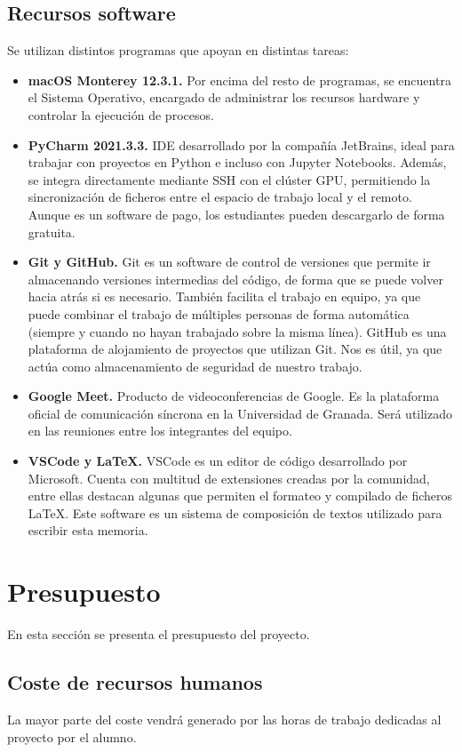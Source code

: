 \subsection{Recursos software}
\noindent Se utilizan distintos programas que apoyan en distintas tareas:
\begin{itemize}
    \item \textbf{macOS Monterey 12.3.1.} Por encima del resto de programas, se encuentra el Sistema Operativo, encargado de administrar los recursos hardware y controlar la ejecución de procesos.
    \item \textbf{PyCharm 2021.3.3.} IDE desarrollado por la compañía JetBrains, ideal para trabajar con proyectos en Python e incluso con Jupyter Notebooks. Además, se integra directamente mediante SSH con el clúster GPU, permitiendo la sincronización de ficheros entre el espacio de trabajo local y el remoto. Aunque es un software de pago, los estudiantes pueden descargarlo de forma gratuita.
    \item \textbf{Git y GitHub.} Git es un software de control de versiones que permite ir almacenando versiones intermedias del código, de forma que se puede volver hacia atrás si es necesario. También facilita el trabajo en equipo, ya que puede combinar el trabajo de múltiples personas de forma automática (siempre y cuando no hayan trabajado sobre la misma línea). GitHub es una plataforma de alojamiento de proyectos que utilizan Git. Nos es útil, ya que actúa como almacenamiento de seguridad de nuestro trabajo.
    \item \textbf{Google Meet.} Producto de videoconferencias de Google. Es la plataforma oficial de comunicación síncrona en la Universidad de Granada. Será utilizado en las reuniones entre los integrantes del equipo.
    \item \textbf{VSCode y \LaTeX.} VSCode es un editor de código desarrollado por Microsoft. Cuenta con multitud de extensiones creadas por la comunidad, entre ellas destacan algunas que permiten el formateo y compilado de ficheros \LaTeX. Este software es un sistema de composición de textos utilizado para escribir esta memoria.
\end{itemize}

\section{Presupuesto}
En esta sección se presenta el presupuesto del proyecto.

\subsection{Coste de recursos humanos}
La mayor parte del coste vendrá generado por las horas de trabajo dedicadas al proyecto por el alumno.

